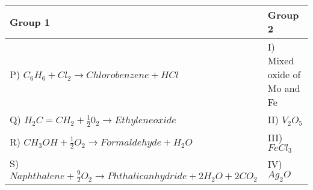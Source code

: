 \begin{table}[H]
\centering
\begin{tabularx}{0.8\textwidth}{|l|X|}
\hline
\textbf{Group 1} & \textbf{Group 2} \\
\hline
P) $C_6H_6 + Cl_2 \to Chlorobenzene + HCl$ & I) Mixed oxide of Mo and Fe \\
\hline
Q) $H_2C = CH_2 + \frac{1}{2}0_2 \to Ethylene oxide$ & II) $V_2O_5$ \\
\hline
R) $CH_3OH + \frac{1}{2}O_2 \to Formaldehyde + H_2O$ & III) $FeCl_3$ \\
\hline
S) $Naphthalene + \frac{9}{2} O_2 \to Phthalic anhydride + 2H_2O + 2CO_2$ & IV) $Ag_2O$ \\
\hline 
\end{tabularx}
\caption*{}
\label{tables:59}
\end{table}